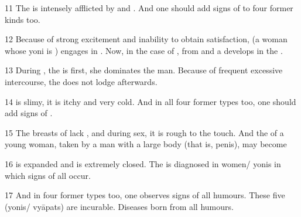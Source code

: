 \begin{translation}
\item [11] The  is intensely afflicted by  and .
And one should add signs of  to four former kinds too. 

\item [12] %
Because of strong excitement and inability to obtain satisfaction, (a woman whose yoni is ) engages in . 
Now, in the case of , from  and  a  develops in the . 

\item[13]
During , the  is first, she dominates the man.
Because of frequent excessive intercourse, the  does not lodge afterwards.

\item [14]
  is slimy, it is itchy and very cold. And in all four former types too, one should add signs of .

\item [15]
The breasts of  lack , and during sex, it is rough to the touch.
And the  of a young woman, taken by a man with a large body (that is, penis), may become 

\item [16]
 is expanded and  is extremely closed.
The  is diagnosed in women/ yonis in which signs of all  occur.

\item [17]
And in four former types too, one observes signs of all humours.
These five (yonis/ vyāpats) are incurable. Diseases born from all humours.


\end{translation}
